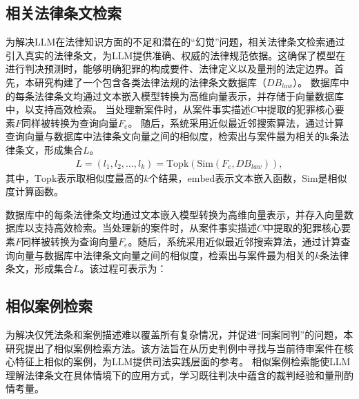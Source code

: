 \subsection{\heiti 相关法律条文检索}
为解决LLM在法律知识方面的不足和潜在的“幻觉”问题，相关法律条文检索通过引入真实的法律条文，为LLM提供准确、权威的法律规范依据。这确保了模型在进行判决预测时，能够明确犯罪的构成要件、法律定义以及量刑的法定边界。首先，本研究构建了一个包含各类法律法规的法律条文数据库（$DB_{law}$​​）。
数据库中的每条法律条文均通过文本嵌入模型转换为高维向量表示，并存储于向量数据库中，以支持高效检索。
当处理新案件时，从案件事实描述$C$中提取的犯罪核心要素$F$同样被转换为查询向量$F_e$​。
随后，系统采用近似最近邻搜索算法，通过计算查询向量与数据库中法律条文向量之间的相似度，检索出与案件最为相关的k条法律条文，形成集合$L$。
\begin{equation}
	\begin{aligned}
		L  =(l_1​,l_2​,\dots,l_k​)
		=\text{Topk}​(\text{Sim}(F_{e},DB_{law})),
	\end{aligned}
	\label{eq:L}
\end{equation}
其中，$\text{Topk}​$表示取相似度最高的$k$个结果，$\text{embed}$表示文本嵌入函数，$\text{Sim}$是相似度计算函数。


数据库中的每条法律条文均通过文本嵌入模型转换为高维向量表示，并存入向量数据库以支持高效检索。当处理新的案件时，从案件事实描述$C$中提取的犯罪核心要素$F$同样被转换为查询向量$F_{e}$。随后，系统采用近似最近邻搜索算法，通过计算查询向量与数据库中法律条文向量之间的相似度，检索出与案件最为相关的$k$条法律条文，形成集合$L$。该过程可表示为：

\subsection{\heiti 相似案例检索}
为解决仅凭法条和案例描述难以覆盖所有复杂情况，并促进“同案同判”的问题，本研究提出了相似案例检索方法。该方法旨在从历史判例中寻找与当前待审案件在核心特征上相似的案例，为LLM提供司法实践层面的参考。
相似案例检索能使LLM理解法律条文在具体情境下的应用方式，学习既往判决中蕴含的裁判经验和量刑酌情考量。

